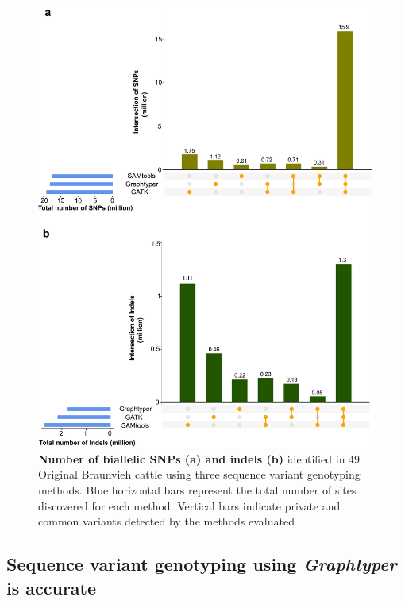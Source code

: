 \documentclass[../main.tex]{subfiles}
\begin{document}
\newpage
\begin{figure}[!htb]
    \centering
    \includegraphics[width=\textwidth]{paper1/main_figure/Figure2.pdf}
    \caption[Number of biallelic variants]{\textbf{Number of biallelic SNPs (a) and indels (b)} identified in 49 Original Braunvieh cattle using three sequence variant genotyping methods. Blue horizontal bars represent the total number of sites discovered for each method. Vertical bars indicate private and common variants detected by the methods evaluated}
    \label{fig:varoverlap}
\end{figure}

\newpage

\subsection*{Sequence variant genotyping using \emph{Graphtyper} is accurate}
\end{document}
